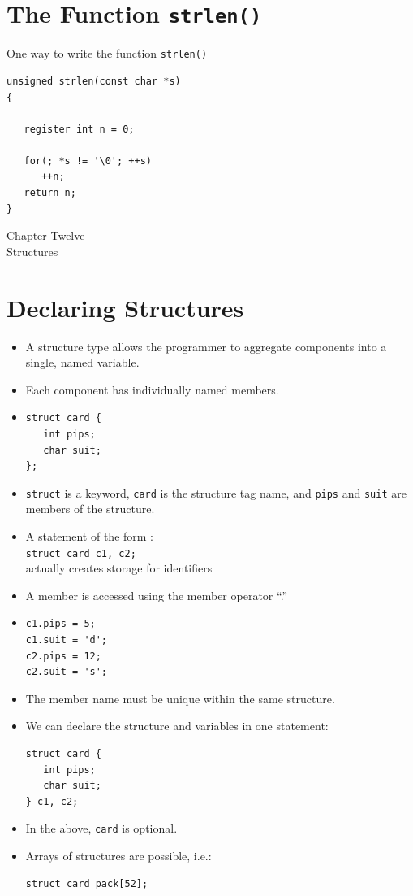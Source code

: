 \documentclass[a4,portraitt]{slides}
\begin{document}
\newpage
\section*{The Function {\tt strlen()}}
One way to write the function \verb^strlen()^
\begin{verbatim}
unsigned strlen(const char *s)
{

   register int n = 0;

   for(; *s != '\0'; ++s)
      ++n;
   return n;
}
\end{verbatim}

\newpage
\begin{center}
{\Large Chapter Twelve\\ Structures}
\end{center}
\vspace{-1.0in}
\section*{Declaring Structures}
\begin{itemize}
\item A structure type allows the programmer to aggregate components
into a single, named variable.
\item Each component has individually named members.
\item \begin{verbatim}
struct card {
   int pips;
   char suit;
};
\end{verbatim}
\item \verb^struct^ is a keyword, \verb^card^ is the structure
tag name, and \verb^pips^ and \verb^suit^ are members of the structure.
\end{itemize}

\newpage
\begin{itemize}
\item A statement of the form :\\
\verb^struct card c1, c2;^\\
actually creates storage for identifiers
\item A member is accessed using the member operator ``.''
\item
\begin{verbatim}
c1.pips = 5;
c1.suit = 'd';
c2.pips = 12;
c2.suit = 's';
\end{verbatim}
\item The member name must be unique within the same structure.
\end{itemize}
\newpage
\begin{itemize}
\item We can declare the structure and variables in one statement:
\begin{verbatim}
struct card {
   int pips;
   char suit;
} c1, c2;
\end{verbatim}
\item In the above, \verb^card^ is optional.
\item Arrays of structures are possible, i.e.:
\begin{verbatim}
struct card pack[52];
\end{verbatim}
\end{itemize}
\end{document}
